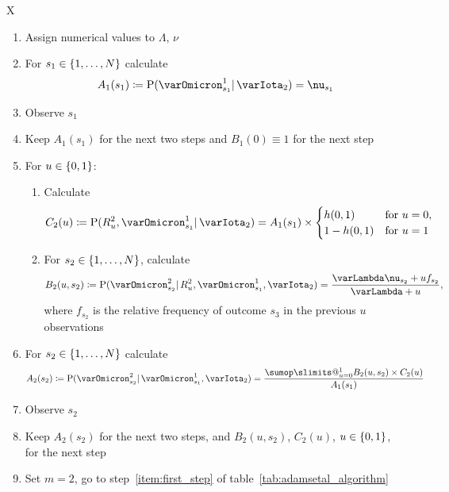 \documentclass[\ifafour a4paper,12pt,\else a5paper,10pt,\fi%
onecolumn,oneside,article,%
british%
]{memoir}
\makeatletter
\theoremstyle{remark}
\theoremstyle{innote}
\def\sum{\DOTSI\sumop\slimits@}
\newcommand*{\defd}{\coloneqq}
\DeclarePairedDelimiter\set{\{}{\}}
\newcommand*{\p}{\mathrm{P}}%
\renewcommand*{\|}{\mathpunct{|}}
\newcommand*{\yff}{f}
\newcommand*{\yI}{\varIota}
\newcommand*{\yO}{\varOmicron}
\newcommand*{\yMc}{\yI_2}
\newcommand*{\yN}{\varLambda}
\newcommand*{\ynn}{\nu}
\newcommand*{\yrs}{h}
\makeatother
\begin{document}
\begin{table}[!p]
  \centering
  \caption{Initial steps of predictive algorithm}
  \label{tab:adamsetal_initial}
  \begin{tabularx}{\textwidth}{X}\hline
    \begin{enumerate}[label=\arabic*]
    \item Assign numerical values to $\yN$, $\ynn$
    \item For $s_1 \in \set{1,\dotsc,N}$ calculate
      \[A_1(s_1)\defd \p(\yO^{1}_{s_{1}} \|  \yMc) =\ynn_{s_1} \]
    \item Observe $s_1$
    \item Keep  $A_1(s_1)$ for the next two steps and $B_1(0)\equiv 1$ for
      the next step

      \bigskip
    \item For $u \in\set{0,1}$:
      \begin{enumerate}[label*=.\arabic*]
   \item Calculate
      \[
        C_2(u) \defd \p(R^{2}_{u}, \yO^{1}_{s_1} \| \yMc)
        =
A_1(s_1) \times \begin{cases}
          \yrs(0,1) &\text{for $u=0$},\\ 1-\yrs(0,1)&\text{for $u=1$}
        \end{cases}
      \]
      \item For $s_{2} \in \set{1,\dotsc,N}$, calculate
        \[ 
          B_{2}(u,s_{2}) \defd
          \p(\yO^{2}_{s_{2}} \| R^{2}_{u}, \yO^{1}_{s_{1}}, \yMc) =
         \frac{\yN\ynn_{s_{2}}+u\yff_{s_{2}}}{\yN + u},
        \]
     where $\yff_{s_{2}}$ is the relative frequency of outcome $s_{3}$ in
     the previous $u$ observations
    \end{enumerate}
  \item  For $s_2 \in \set{1,\dotsc,N}$ calculate
      \[A_2(s_2) \defd
        \p(\yO^{2}_{s_{2}} \| \yO^{1}_{s_{1}}, \yMc) =
\frac{\sum_{u=0}^{1} B_{2}(u,s_{2}) \times C_{2}(u)}{A_{1}(s_{1})} \]
\item Observe $s_2$
\item Keep $A_{2}(s_{2})$ for the next two steps, and
  $B_{2}(u,s_{2})$, $C_{2}(u)$, $u\in\set{0,1}$, for the next step
\item Set $m=2$, go to step~\ref{item:first_step} of table~\ref{tab:adamsetal_algorithm}
\end{enumerate}
\\\hline
  \end{tabularx}
\end{table}
\end{document}

